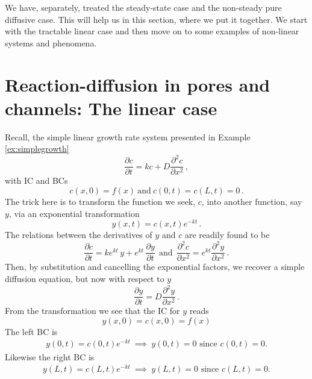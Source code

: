 
We have, separately, treated the steady-state case and the non-steady pure diffusive case. 
This will help us in this section, where we put it together. We start with the 
tractable linear case and then move on to some examples of non-linear systems and phenomena.

\section{Reaction-diffusion in pores and channels: The linear case}
Recall, the simple linear growth rate system presented in Example
\ref{ex:simplegrowth}
\begin{equation}
	\label{eq:simplerdgrowth}
  \frac{\partial c}{\partial t} = kc + D\frac{\partial^2 c}{\partial x^2}  \, ,
\end{equation}
with IC and BCs 
\begin{equation}
  c(x,0) = f(x) \ \text{and} \ c(0,t)=c(L,t)=0 \, .
\end{equation}
The trick here is to transform the function we seek, $c$, into another 
function, say $y$, via an exponential transformation
\begin{equation}
  y(x,t) = c(x,t)e^{-k t} \, .
\end{equation}
The relations between the derivatives of $y$ and $c$ are readily found to be 
\begin{equation}
  \frac{\partial c}{\partial t} = ke^{kt} \, y + e^{kt} \, \frac{\partial y}{\partial t}
  \ \ \text{and} \ \ \frac{\partial^2 c}{\partial x^2} = e^{kt}  \frac{\partial^2 
    y}{\partial x^2}  \ .
\end{equation}
Then, by substitution and cancelling the exponential factors, we recover a simple
diffusion equation, but now with respect to $y$
\begin{equation}
  \frac{\partial y}{\partial t} = D\frac{\partial^2 y}{\partial x^2} \, .
\end{equation}
From the transformation we see that the IC for $y$ reads
\begin{equation}
	y(x,0) = c(x,0) = f(x)
\end{equation}
The left BC is 
\begin{eqnarray}
	y(0,t) = c(0,t)e^{-k t} \ \implies \ y(0,t) = 0 \text{ since } c(0,t)=0.
\end{eqnarray}
Likewise the right BC is
\begin{eqnarray}
	y(L,t) = c(L,t)e^{-k t} \ \implies \ y(L,t) = 0 \text{ since } c(L,t)=0.
\end{eqnarray}
